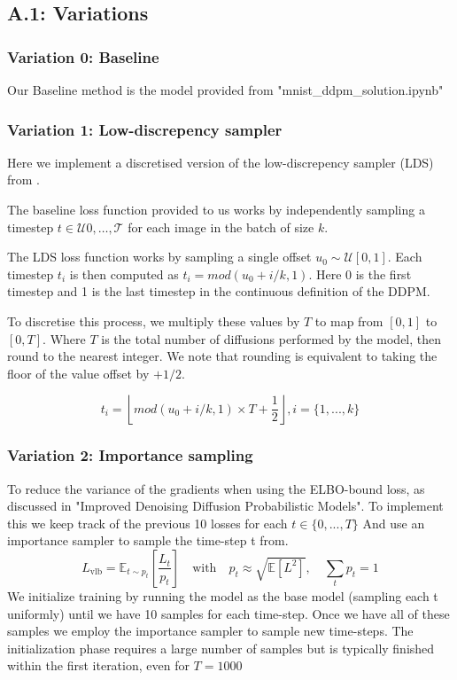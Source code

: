 \subsection{A.1: Variations}
\subsubsection{Variation 0: Baseline}
Our Baseline method is the model provided from "mnist\_ddpm\_solution.ipynb"

\subsubsection{Variation 1: Low-discrepency sampler}
Here we implement a discretised version of the low-discrepency sampler (LDS) from \cite{kingma2023variationaldiffusionmodels}.

The baseline loss function provided to us works by independently sampling a timestep $t \in \mathcal{U{0, \ldots, T}}$ for each image in the batch of size $k$.
 
The LDS loss function works by sampling a single offset $u_0 \sim \mathcal{U}[0,1]$.
Each timestep $t_i$ is then computed as $t_i = mod(u_0 + i/k, 1)$. Here 0 is the first timestep and 1 is the last timestep in the continuous definition of the DDPM.

To discretise this process, we multiply these values by $T$ to map from $[0,1]$ to $[0, T]$. Where $T$ is the total number of diffusions performed by the model, then round to the nearest integer.
We note that rounding is equivalent to taking the floor of the value offset by $+1/2$.

\begin{equation}
  t_i = \left\lfloor mod(u_0 + i/k, 1) \times T + \frac{1}{2} \right\rfloor, i = \{1, ..., k\}
\end{equation}


\subsubsection{Variation 2: Importance sampling}
To reduce the variance of the gradients when using the ELBO-bound loss, as discussed in "Improved Denoising Diffusion Probabilistic Models". 
To implement this we keep track of the previous 10 losses for each $t \in \{0,...,T\}$ And use an importance sampler to sample the time-step t from.
\[
L_{\text{vlb}} = \mathbb{E}_{t \sim p_t} \left[ \frac{L_t}{p_t} \right] \quad \text{with} \quad p_t \approx \sqrt{\mathbb{E}[L^2]}, \quad \sum_t p_t = 1
\]
We initialize training by running the model as the base model (sampling each t uniformly) until we have 10 samples for each time-step.
Once we have all of these samples we employ the importance sampler to sample new time-steps.
The initialization phase requires a large number of samples but is typically finished within the first iteration, even for $T=1000$

